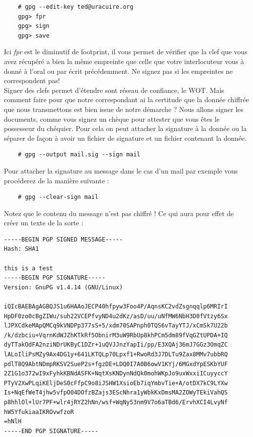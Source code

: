 \documentclass[a4paper]{article}
\begin{document}
\begin{verbatim}
    # gpg --edit-key ted@uracuire.org
    gpg> fpr
    gpg> sign
    gpg> save
\end{verbatim}

Ici \emph{fpr} est le diminutif de footprint, il vous permet de vérifier que la
clef que vous avez récupéré a bien la même empreinte que celle que votre
interlocuteur vous à donné à l'oral ou par écrit précédemment.
Ne signez pas si les empreintes ne correspondent pas!
\\
Signer des clefs permet d'étendre sont réseau de confiance, le WOT. Mais comment
faire pour que notre correspondant ai la certitude que la donnée chiffrée que
nous transmettons est bien issue de notre démarche ? Nous allons signer les
documents, comme vous signez un chèque pour attester que vous êtes le possesseur
du chéquier. Pour cela on peut attacher la signature à la donnée ou la séparer
de façon à avoir un fichier de signature et un fichier contenant la donnée.

\begin{verbatim}
    # gpg --output mail.sig --sign mail
\end{verbatim}

Pour attacher la signature au message dans le cas d'un mail par exemple vous
procéderez de la manière suivante :
\begin{verbatim}
    # gpg --clear-sign mail
\end{verbatim}
Notez que le contenu du message n'est pas chiffré !
\newpage
Ce qui aura pour effet de créer un texte de la sorte :
\begin{verbatim}
-----BEGIN PGP SIGNED MESSAGE-----
Hash: SHA1

this is a test
-----BEGIN PGP SIGNATURE-----
Version: GnuPG v1.4.14 (GNU/Linux)

iQIcBAEBAgAGBQJS1u6HAAoJECP40hfpyw3Foo4P/AqnsKC2vdZsgnqqlp6MRIrI
HpDF0zo0cBgZIWu/suh22VCEPfvyND4u2dKz/asD/uu/uNfMW6NbH3D0fVtzy6Sx
lJPXCdkeMApQMCq9kVNDPp377sS+5/xdm70SAPnph0TQS6vTayYTJ/xCmSk7U22b
/k/dzbciu+VqrnKdWJZhKTkRf5ObnirM3uW9RbUp8khPCm5dm89fVqGZtUPDA+IQ
dyTTakOdFA2nziNDrUKByC1DZr+1uQVJJnzYapIi/pp/E3XQAj36mJ7GGz3OmqZC
lALoIliPsMZy9Ax4DG1y+641LKTQLp70Lpxf1+RwoRd3J7DLTu9Zax8MMv7ubbRQ
pdlT8Q9AbtNDmpRKSV2SueP2s+fgzDE+LDQ0I7A0B6owV1KYj/6MGxdYpESKbYUF
2Z1G1o372wI9xFyhkKBNdASFK+NqtXsKNDynNdQk0mohWKpJo9uxWxxiICuyyccY
PTyV2XwPLqiKEljDeS0cFfpC9o8iJSHW1XsioEb7iqYmbvTie+A/otDX7kC9LYXw
Is+NqEfWeT4jhw5vfpO04DOfzBZajs3EScNhra1yWbkKxDmsMA2ZOWyTEkiVahQS
p8hhlOl+lUr7PF+wlr4jRYZ2hNn/wsf+WqNy53nm9V7o6aTBd6/ErvhXCI4LvyNf
hW5YfukiaaIKROvwfzoR
=hNlH
-----END PGP SIGNATURE-----
\end{verbatim}
\end{document}
